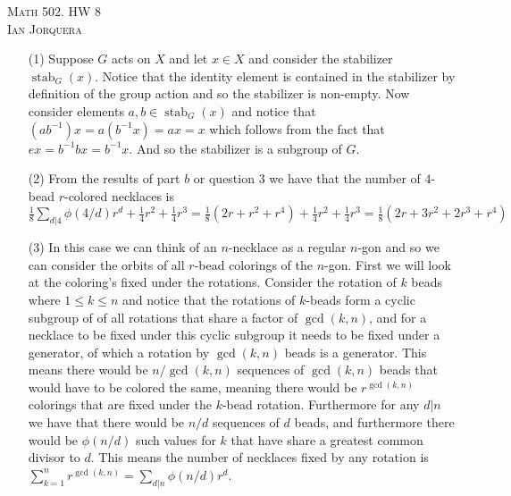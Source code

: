 \documentclass[12pt]{amsart}
\DeclareMathOperator{\stab}{\mathrm{stab}}
\begin{document}
\begin{center}
    \textsc{Math 502. HW 8\\ Ian Jorquera}
\end{center}
\vspace{1em}

\begin{itemize}
\item[(1)] Suppose $G$ acts on $X$ and let $x\in X$ and consider the stabilizer $\stab_G(x)$. Notice that the identity element is contained in the stabilizer by definition of the group action and so the stabilizer is non-empty. Now consider elements $a,b\in \stab_G(x)$ and notice that $(ab^{-1}) x=a(b^{-1}x)=ax=x$ which follows from the fact that $ex=b^{-1}bx=b^{-1}x$. And so the stabilizer is a subgroup of $G$.\\
\item[(2)] %
From the results of part $b$ or question $3$ we have that the number of $4$-bead $r$-colored necklaces is $\frac{1}{8}\sum_{d|4}\phi(4/d)r^d+\frac{1}{4}r^{2}+\frac{1}{4}r^{3}=\frac{1}{8}(2r+r^2+r^4)+\frac{1}{4}r^{2}+\frac{1}{4}r^{3}=\frac{1}{8}(2r+3r^2+2r^3+r^4)$\\


\item[(3)] %
In this case we can think of an $n$-necklace as a regular $n$-gon and so we can consider the orbits of all $r$-bead colorings of the $n$-gon. First we will look at the coloring's fixed under the rotations. Consider the rotation of $k$ beads where $1\leq k\leq n$ and notice that the rotations of $k$-beads form a cyclic subgroup of of all rotations that share a factor of $\gcd(k,n)$, and for a necklace to be fixed under this cyclic subgroup it needs to be fixed under a generator, of which a rotation by $\gcd(k,n)$ beads is a generator. This means there would be $n/\gcd(k,n)$ sequences of $\gcd(k,n)$ beads that would have to be colored the same, meaning there would be $r^{\gcd(k,n)}$ colorings that are fixed under the $k$-bead rotation. Furthermore for any $d|n$ we have that there would be $n/d$ sequences of $d$ beads, and furthermore there would be $\phi(n/d)$ such values for $k$ that have share a greatest common divisor to $d$. This means the number of necklaces fixed by any rotation is $\sum_{k=1}^{n}r^{\gcd(k,n)}=\sum_{d|n}\phi(n/d)r^d$.\\


\end{itemize}
\end{document}
